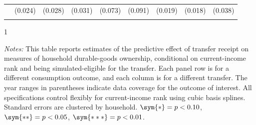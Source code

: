\begin{table}[t!]
\begin{tabular*}{1.36\textwidth}{@{\extracolsep{\fill}}lcccccccc}
                  & (0.024)       & (0.028)       & (0.031)       & (0.073)       & (0.091)       & (0.019)       & (0.018)       & (0.038)      \\ \addlinespace  
                  \bottomrule
\end{tabular*}
\begin{spacing}{1}
    \begin{tablenotes}
          \item \footnotesize \textit{Notes:} This table reports estimates of the predictive effect of transfer receipt on measures of household durable-goods ownership, conditional on current-income rank and being simulated-eligible for the transfer. Each panel row is for a different consumption outcome, and each column is for a different transfer. The year ranges in parentheses indicate data coverage for the outcome of interest. All specifications control flexibly for current-income rank using cubic basis splines. Standard errors are clustered by household. $\sym{*} = p < 0.10$, $\sym{**} = p < 0.05$, $\sym{***} = p < 0.01$.
          \end{tablenotes}
           \end{spacing}
    \end{table}
